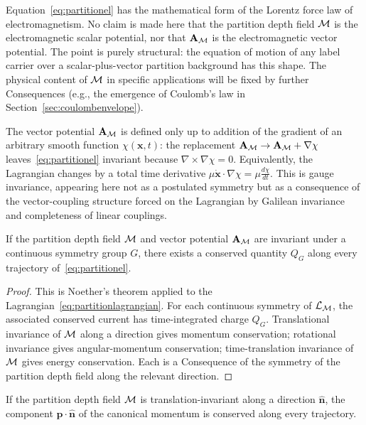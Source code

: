 \begin{interpretation}
Equation~\eqref{eq:partitionel} has the mathematical form of the Lorentz force law of electromagnetism. No claim is made here that the partition depth field $\mathcal{M}$ is the electromagnetic scalar potential, nor that $\mathbf{A}_{\mathcal{M}}$ is the electromagnetic vector potential. The point is purely structural: the equation of motion of any label carrier over a scalar-plus-vector partition background has this shape. The physical content of $\mathcal{M}$ in specific applications will be fixed by further Consequences (e.g., the emergence of Coulomb's law in Section~\ref{sec:coulombenvelope}).
\end{interpretation}

\begin{remark}
The vector potential $\mathbf{A}_{\mathcal{M}}$ is defined only up to addition of the gradient of an arbitrary smooth function $\chi(\mathbf{x},t)$: the replacement $\mathbf{A}_{\mathcal{M}}\to\mathbf{A}_{\mathcal{M}}+\nabla\chi$ leaves~\eqref{eq:partitionel} invariant because $\nabla\times\nabla\chi=0$. Equivalently, the Lagrangian changes by a total time derivative $\mu\dot{\mathbf{x}}\cdot\nabla\chi=\mu\tfrac{d\chi}{dt}$. This is gauge invariance, appearing here not as a postulated symmetry but as a consequence of the vector-coupling structure forced on the Lagrangian by Galilean invariance and completeness of linear couplings.
\end{remark}

\begin{proposition}
\label{prop:noether}
If the partition depth field $\mathcal{M}$ and vector potential $\mathbf{A}_{\mathcal{M}}$ are invariant under a continuous symmetry group $G$, there exists a conserved quantity $Q_{G}$ along every trajectory of~\eqref{eq:partitionel}.
\end{proposition}

\begin{proof}
This is Noether's theorem applied to the Lagrangian~\eqref{eq:partitionlagrangian}. For each continuous symmetry of $\mathcal{L}_{\mathcal{M}}$, the associated conserved current has time-integrated charge $Q_{G}$. Translational invariance of $\mathcal{M}$ along a direction gives momentum conservation; rotational invariance gives angular-momentum conservation; time-translation invariance of $\mathcal{M}$ gives energy conservation. Each is a Consequence of the symmetry of the partition depth field along the relevant direction.
\end{proof}

\begin{corollary}
\label{cor:momcon}
If the partition depth field $\mathcal{M}$ is translation-invariant along a direction $\hat{\mathbf{n}}$, the component $\mathbf{p}\cdot\hat{\mathbf{n}}$ of the canonical momentum is conserved along every trajectory.
\end{corollary}

